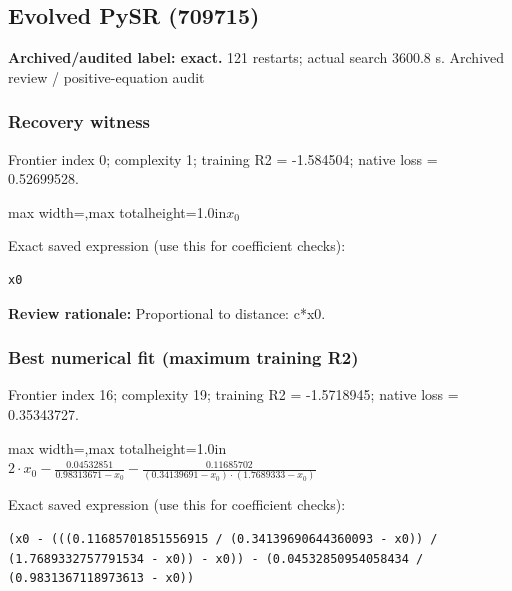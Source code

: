 \documentclass[10pt,letterpaper,landscape]{article}
\begin{document}
\begin{minipage}[t]{0.485\textwidth}
\subsection*{Evolved PySR (709715)}
\textbf{Archived/audited label: exact.} 121 restarts; actual search 3600.8 s.
{\small Archived review / positive-equation audit}
\subsubsection*{Recovery witness}
Frontier index 0; complexity 1; training R2 = -1.584504; native loss = 0.52699528.
\begin{center}\begin{adjustbox}{max width=\linewidth,max totalheight=1.0in}$\displaystyle x_{0}$\end{adjustbox}\end{center}
{\scriptsize Exact saved expression (use this for coefficient checks):}
\begin{lstlisting}
x0
\end{lstlisting}
{\small\textbf{Review rationale:} Proportional to distance: c*x0.}
\subsubsection*{Best numerical fit (maximum training R2)}
Frontier index 16; complexity 19; training R2 = -1.5718945; native loss = 0.35343727.
\begin{center}\begin{adjustbox}{max width=\linewidth,max totalheight=1.0in}$\displaystyle 2 \cdot x_{0} - \frac{0.04532851}{0.98313671 - x_{0}} - \frac{0.11685702}{\left(0.34139691 - x_{0}\right) \cdot \left(1.7689333 - x_{0}\right)}$\end{adjustbox}\end{center}
{\scriptsize Exact saved expression (use this for coefficient checks):}
\begin{lstlisting}
(x0 - (((0.11685701851556915 / (0.34139690644360093 - x0)) / (1.7689332757791534 - x0)) - x0)) - (0.04532850954058434 / (0.9831367118973613 - x0))
\end{lstlisting}
\end{minipage}
\clearpage{}\label{ideal_gas-10000}
\end{document}
